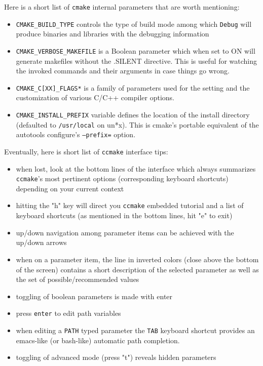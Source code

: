 \noindent
Here is a short list of \verb+cmake+ internal parameters that are worth
mentioning:
\begin{itemize}
\item
  \verb+CMAKE_BUILD_TYPE+ controls the type of build mode among which 
  \verb+Debug+ will produce binaries and libraries with the debugging
   information
\item
   \verb+CMAKE_VERBOSE_MAKEFILE+ is a Boolean parameter which when set to
   ON will generate makefiles without the .SILENT directive. This is
   useful for watching the invoked commands and their arguments in case
   things go wrong.
\item
   \verb+CMAKE_C[XX]_FLAGS*+ is a family of parameters used for
   the setting and the customization of various C/C++ compiler options.
\item
   \verb+CMAKE_INSTALL_PREFIX+ variable defines the location
   of the install directory (defaulted to \verb+/usr/local+ on un*x).
   This is cmake's portable equivalent of the autotools configure's
   \texttt{--prefix=} option.
\end{itemize}
%
Eventually, here is short list of \verb+ccmake+ interface tips:
\begin{itemize}
\item
  when lost, look at the bottom lines of the interface which always
  summarizes \verb+ccmake+'s most pertinent options (corresponding
  keyboard shortcuts) depending on your current context
\item
  hitting the "h" key will direct you \verb+ccmake+ embedded tutorial
  and a list of keyboard shortcuts (as mentioned in the bottom
  lines, hit "e" to exit)
\item
  up/down navigation among parameter items can be achieved with the
  up/down arrows
\item
  when on a parameter item, the line in inverted colors (close above the
  bottom of the screen) contains a short description of the selected
  parameter as well as the set of possible/recommended values
\item
  toggling of boolean parameters is made with enter
\item
  press \verb+enter+ to edit path variables
\item
  when editing a \verb+PATH+ typed parameter the \verb+TAB+ keyboard
  shortcut provides an emacs-like (or bash-like) automatic path completion.
\item
  toggling of advanced mode (press "t") reveals hidden parameters
\end{itemize}
 
